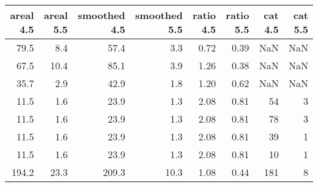 \begin{tabular}{rrrrrrrr}
\toprule
 areal 4.5 &  areal 5.5 &  smoothed 4.5 &  smoothed 5.5 &  ratio 4.5 &  ratio 5.5 &  cat 4.5 &  cat 5.5 \\
\midrule
      79.5 &        8.4 &          57.4 &           3.3 &       0.72 &       0.39 &      NaN &      NaN \\
      67.5 &       10.4 &          85.1 &           3.9 &       1.26 &       0.38 &      NaN &      NaN \\
      35.7 &        2.9 &          42.9 &           1.8 &       1.20 &       0.62 &      NaN &      NaN \\
      11.5 &        1.6 &          23.9 &           1.3 &       2.08 &       0.81 &       54 &        3 \\
      11.5 &        1.6 &          23.9 &           1.3 &       2.08 &       0.81 &       78 &        3 \\
      11.5 &        1.6 &          23.9 &           1.3 &       2.08 &       0.81 &       39 &        1 \\
      11.5 &        1.6 &          23.9 &           1.3 &       2.08 &       0.81 &       10 &        1 \\
     194.2 &       23.3 &         209.3 &          10.3 &       1.08 &       0.44 &      181 &        8 \\
\bottomrule
\end{tabular}
